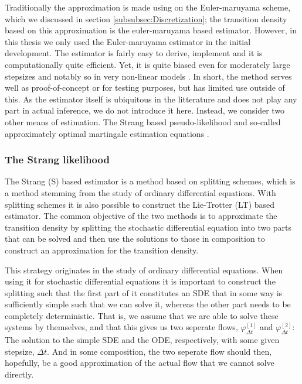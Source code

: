 Traditionally the approximation is made using on the Euler-maruyama scheme, which we discussed in section \ref{subsubsec:Discretization}; the transition density based on this approximation is the euler-maruyama based estimator. However, in this thesis we only used the Euler-maruyama estimator in the initial development. The estimator is fairly easy to derive, implement and it is computationally quite efficient. Yet, it is quite biased even for moderately large stepsizes and notably so in very non-linear models \cite{SplittingSchemes}. In short, the method serves well as proof-of-concept or for testing purposes, but has limited use outside of this. As the estimator itself is ubiquitous in the litterature and does not play any part in actual inference, we do not introduce it here. Instead, we consider two other means of estimation. The Strang based pseudo-likelihood \cite{SplittingSchemes} and so-called approximately optimal martingale estimation equations \cite{StatisticalMethodsForSDE}.
\subsubsection{The Strang likelihood}
The Strang (S) based estimator is a method based on splitting schemes, which is a method stemming from the study of ordinary differential equations. With splitting schemes it is also possible to construct the Lie-Trotter (LT) based estimator. The common objective of the two methods is to approximate the transition density by splitting the stochastic differential equation into two parts that can be solved and then use the solutions to those in composition to construct an approximation for the transition density.

This strategy originates in the study of ordinary differential equations. When using it for stochastic differential equations it is important to construct the splitting such that the first part of it constitutes an SDE that in some way is sufficiently simple such that we can solve it, whereas the other part needs to be completely deterministic. That is, we assume that we are able to solve these systems by themselves, and that this gives us two seperate flows, $\varphi_{\Delta t}^{[1]}$ and $\varphi_{\Delta t}^{[2]}$: The solution to the simple SDE and the ODE, respectively, with some given stepsize, $\Delta t$. And in some composition, the two seperate flow should then, hopefully, be a good approximation of the actual flow that we cannot solve directly.

